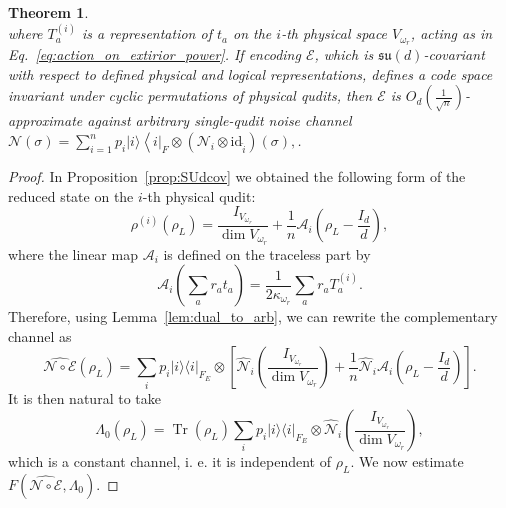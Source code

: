 \documentclass[10pt,twocolumn,superscriptaddress,aps,amsmath,amssymb,citeautoscript,floatfix,prx]{revtex4-2}
\theoremstyle{plain}
\theoremstyle{plain}
\theoremstyle{plain}
\theoremstyle{plain}
\theoremstyle{plain}
\theoremstyle{plain}
\theoremstyle{plain}
\newtheorem{smtheorem}{Theorem}[section]
\theoremstyle{definition}
\theoremstyle{plain}
\begin{document}
\begin{appendix}
\begin{smtheorem}
\begin{equation}
\end{equation} 
where $T_a^{(i)}$ is a representation of $t_a$ on the $i$-th physical space $V_{\omega_r}$, acting as in Eq.~\eqref{eq:action_on_extirior_power}. 
If encoding $\mathcal{E}$, which is $\mathfrak{su}(d)$-covariant with respect to defined physical and logical representations, 
defines a code space invariant under cyclic permutations of physical qudits, then $\mathcal{E}$ is $O_{d}\left(\frac{1}{\sqrt{n}}\right)$-approximate against arbitrary single-qudit noise 
channel $\mathcal{N}(\sigma)=\sum_{i=1}^n p_i|i\rangle\left\langle\left. i\right|_F \otimes\left(\mathcal{N}_i \otimes \mathrm{id}_{\hat{i}}\right)(\sigma),\right.$.
\end{smtheorem}
\begin{proof}
In Proposition~\ref{prop:SUdcov} we obtained the following form of the reduced state on the \(i\)-th physical qudit:
\[
\rho^{(i)}(\rho_L)
=
\frac{I_{V_{\omega_r}}}{\dim V_{\omega_r}}
+
\frac{1}{n}\mathcal A_i\left(\rho_L-\frac{I_d}{d}\right),
\]
where the linear map \(\mathcal A_i\) is defined on the traceless part by
\[
\mathcal A_i\left(\sum_a r_a t_a\right)
=
\frac{1}{2\kappa_{\omega_r}}\sum_a r_a T_a^{(i)} .
\]
Therefore, using Lemma~\ref{lem:dual_to_arb}, we can rewrite the complementary channel as
\[
\widehat{\mathcal{N} \circ \mathcal{E}}(\rho_L)
=
\sum_i p_i |i\rangle\langle i|_{F_E}\otimes
\left[
\widehat{\mathcal N}_i\left(\frac{I_{V_{\omega_r}}}{\dim V_{\omega_r}}\right)
+
\frac{1}{n}
\widehat{\mathcal N}_i\mathcal A_i\left(\rho_L-\frac{I_d}{d}\right)
\right].
\]
It is then natural to take
\[
\Lambda_0(\rho_L)
=
\operatorname{Tr}(\rho_L)
\sum_i p_i |i\rangle\langle i|_{F_E}\otimes
\widehat{\mathcal N}_i\left(\frac{I_{V_{\omega_r}}}{\dim V_{\omega_r}}\right),
\]
which is a constant channel, i. e. it is independent of \(\rho_L\). We now estimate \(F(\widehat{\mathcal{N} \circ \mathcal{E}},\Lambda_0)\).


\end{proof}
\end{appendix}
\end{document}
